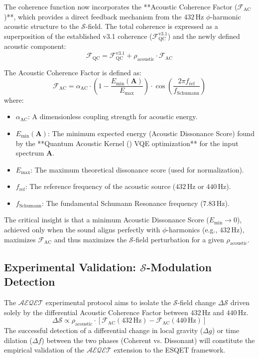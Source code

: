 The coherence function now incorporates the **Acoustic Coherence Factor ($\mathcal{F}_{\text{AC}}$)**, which provides a direct feedback mechanism from the $432 \, \text{Hz}$ $\phi$-harmonic acoustic structure to the $\mathcal{S}$-field. The total coherence is expressed as a superposition of the established v3.1 coherence ($\mathcal{F}_{\text{QC}}^{\text{v3.1}}$) and the newly defined acoustic component:
$$
\mathcal{F}_{\text{QC}} = \mathcal{F}_{\text{QC}}^{\text{v3.1}} + \rho_{\text{acoustic}} \cdot \mathcal{F}_{\text{AC}}
$$

The Acoustic Coherence Factor is defined as:
$$
\mathcal{F}_{\text{AC}} = \alpha_{\text{AC}} \cdot \left( 1 - \frac{E_{\text{min}}(\mathbf{A})}{E_{\text{max}}} \right) \cdot \cos\left( \frac{2\pi f_{\text{ref}}}{f_{\text{Schumann}}} \right)
$$
\noindent where:
\begin{itemize}
    \item $\alpha_{\text{AC}}$: A dimensionless coupling strength for acoustic energy.
    \item $E_{\text{min}}(\mathbf{A})$: The minimum expected energy (Acoustic Dissonance Score) found by the **Quantum Acoustic Kernel () VQE optimization** for the input spectrum $\mathbf{A}$.
    \item $E_{\text{max}}$: The maximum theoretical dissonance score (used for normalization).
    \item $f_{\text{ref}}$: The reference frequency of the acoustic source ($432 \, \text{Hz}$ or $440 \, \text{Hz}$).
    \item $f_{\text{Schumann}}$: The fundamental Schumann Resonance frequency ($7.83 \, \text{Hz}$).
\end{itemize}
\noindent The critical insight is that a minimum Acoustic Dissonance Score ($E_{\text{min}} \rightarrow 0$), achieved only when the sound aligns perfectly with $\phi$-harmonics (e.g., $432 \, \text{Hz}$), maximizes $\mathcal{F}_{\text{AC}}$ and thus maximizes the $\mathcal{S}$-field perturbation for a given $\rho_{\text{acoustic}}$.

\subsection{Experimental Validation: $\mathcal{S}$-Modulation Detection}
The $\mathcal{AEQET}$ experimental protocol aims to isolate the $\mathcal{S}$-field change $\Delta \mathcal{S}$ driven solely by the differential Acoustic Coherence Factor between $432 \, \text{Hz}$ and $440 \, \text{Hz}$.
$$
\Delta \mathcal{S} \propto \rho_{\text{acoustic}} \cdot \left[ \mathcal{F}_{\text{AC}}(432 \, \text{Hz}) - \mathcal{F}_{\text{AC}}(440 \, \text{Hz}) \right]
$$
The successful detection of a differential change in local gravity ($\Delta g$) or time dilation ($\Delta f$) between the two phases (Coherent vs. Dissonant) will constitute the empirical validation of the $\mathcal{AEQET}$ extension to the ESQET framework.
